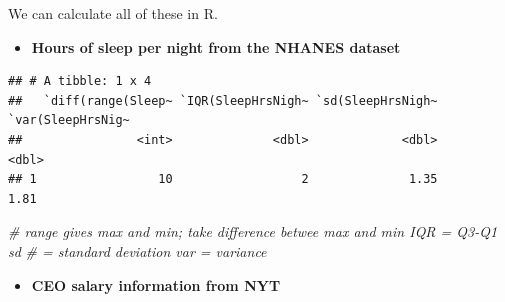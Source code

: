 \documentclass[]{book}
\newenvironment{Shaded}{\begin{snugshade}}{\end{snugshade}}
\newcommand{\CommentTok}[1]{\textcolor[rgb]{0.56,0.35,0.01}{\textit{#1}}}
\newcommand{\DataTypeTok}[1]{\textcolor[rgb]{0.13,0.29,0.53}{#1}}
\newcommand{\KeywordTok}[1]{\textcolor[rgb]{0.13,0.29,0.53}{\textbf{#1}}}
\newcommand{\NormalTok}[1]{#1}
\newcommand{\OperatorTok}[1]{\textcolor[rgb]{0.81,0.36,0.00}{\textbf{#1}}}
\newcommand{\OtherTok}[1]{\textcolor[rgb]{0.56,0.35,0.01}{#1}}
\newcommand{\StringTok}[1]{\textcolor[rgb]{0.31,0.60,0.02}{#1}}
\providecommand{\tightlist}{%
  \setlength{\itemsep}{0pt}\setlength{\parskip}{0pt}}
\begin{document}
We can calculate all of these in R.

\begin{itemize}
\tightlist
\item
  \textbf{Hours of sleep per night from the NHANES dataset}
\end{itemize}

\begin{Shaded}
\end{Shaded}

\begin{verbatim}
## # A tibble: 1 x 4
##   `diff(range(Sleep~ `IQR(SleepHrsNigh~ `sd(SleepHrsNigh~ `var(SleepHrsNig~
##                <int>              <dbl>             <dbl>             <dbl>
## 1                 10                  2              1.35              1.81
\end{verbatim}

\begin{Shaded}
\begin{Highlighting}[]
\CommentTok{# range gives max and min; take difference betwee max and min IQR = Q3-Q1 sd}
\CommentTok{# = standard deviation var = variance}
\end{Highlighting}
\end{Shaded}

\begin{itemize}
\tightlist
\item
  \textbf{CEO salary information from NYT}
\end{itemize}

\begin{Shaded}
\end{Shaded}
\end{document}
